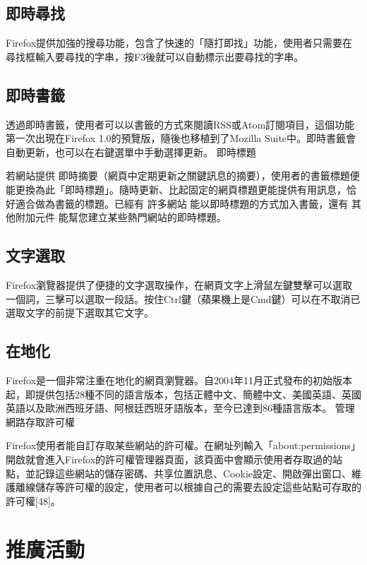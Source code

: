 \documentclass[12pt, a4paper, twoside]{article}
\begin{document}
\subsection{即時尋找}

Firefox提供加強的搜尋功能，包含了快速的「隨打即找」功能，使用者只需要在尋找框輸入要尋找的字串，按F3後就可以自動標示出要尋找的字串。
\subsection{即時書籤}

透過即時書籤，使用者可以以書籤的方式來閱讀RSS或Atom訂閱項目，這個功能第一次出現在Firefox 1.0的預覽版，隨後也移植到了Mozilla Suite中。即時書籤會自動更新，也可以在右鍵選單中手動選擇更新。
即時標題

若網站提供 即時摘要（網頁中定期更新之關鍵訊息的摘要），使用者的書籤標題便能更換為此「即時標題」。隨時更新、比起固定的網頁標題更能提供有用訊息，恰好適合做為書籤的標題。已經有 許多網站 能以即時標題的方式加入書籤，還有 其他附加元件 能幫您建立某些熱門網站的即時標題。

\subsection{文字選取}

Firefox瀏覽器提供了便捷的文字選取操作，在網頁文字上滑鼠左鍵雙擊可以選取一個詞，三擊可以選取一段話。按住Ctrl鍵（蘋果機上是Cmd鍵）可以在不取消已選取文字的前提下選取其它文字。

\subsection{在地化}

Firefox是一個非常注重在地化的網頁瀏覽器。自2004年11月正式發布的初始版本起，即提供包括28種不同的語言版本，包括正體中文、簡體中文、美國英語、英國英語以及歐洲西班牙語、阿根廷西班牙語版本，至今已達到86種語言版本。
管理網路存取許可權

Firefox使用者能自訂存取某些網站的許可權。在網址列輸入「about:\allowbreak{}permissions」開啟就會進入Firefox的許可權管理器頁面，該頁面中會顯示使用者存取過的站點，並記錄這些網站的儲存密碼、共享位置訊息、Cookie設定、開啟彈出窗口、維護離線儲存等許可權的設定，使用者可以根據自己的需要去設定這些站點可存取的許可權[48]。

\section{推廣活動}
\end{document}
